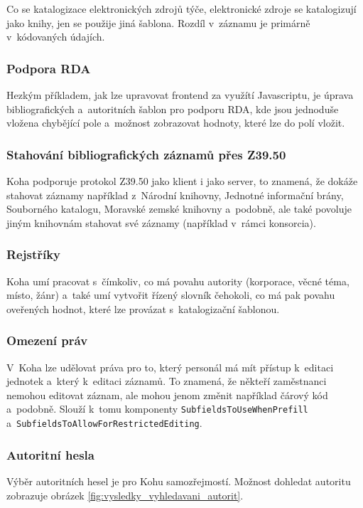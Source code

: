 \documentclass[
	11pt, oneside, printed, final, palatino
	microtype,
	table,   %
	lof,     %
	lot     %
]{fithesis3}
\newcommand{\code}[1]{\texttt{#1}}
\begin{document}
{Co se katalogizace elektronických zdrojů týče, elektronické zdroje se katalogizují jako knihy, jen se použije jiná šablona. Rozdíl v~záznamu je primárně v~kódovaných údajích.

\subsubsection{{\large Podpora RDA}}
Hezkým příkladem, jak lze upravovat frontend za využítí Javascriptu, je úprava bibliografických a~autoritních šablon pro podporu RDA, kde jsou jednoduše vložena chybějící pole a~možnost zobrazovat hodnoty, které lze do polí vložit.

\subsubsection{{Stahování bibliografických záznamů přes Z39.50}}
Koha podporuje protokol Z39.50 jako klient i jako server, to znamená, že dokáže stahovat záznamy například z~Národní knihovny, Jednotné informační brány, Souborného katalogu, Moravské zemské knihovny a~podobně, ale také povoluje jiným knihovnám stahovat své záznamy (například v~rámci konsorcia).

\subsubsection{{\large Rejstříky}}
Koha umí pracovat s~čímkoliv, co má povahu autority (korporace, věcné téma, místo, žánr) a~také umí vytvořit řízený slovník čehokoli, co má pak povahu oveřených hodnot, které lze provázat s~katalogizační šablonou.

\subsubsection{{\large Omezení práv}}
V~Koha lze udělovat práva pro to, který personál má mít přístup k~editaci jednotek a~který k~editaci záznamů. To znamená, že někteří zaměstnanci nemohou editovat záznam, ale mohou jenom změnit například čárový kód a~podobně. Slouží k~tomu komponenty \code{SubfieldsToUseWhenPrefill} a~\code{SubfieldsToAllowForRestrictedEditing}.

\subsubsection{{\large Autoritní hesla}}
Výběr autoritních hesel je pro Kohu samozřejmostí. Možnost dohledat autoritu zobrazuje obrázek \ref{fig:vysledky_vyhledavani_autorit}.

}
\end{document}
